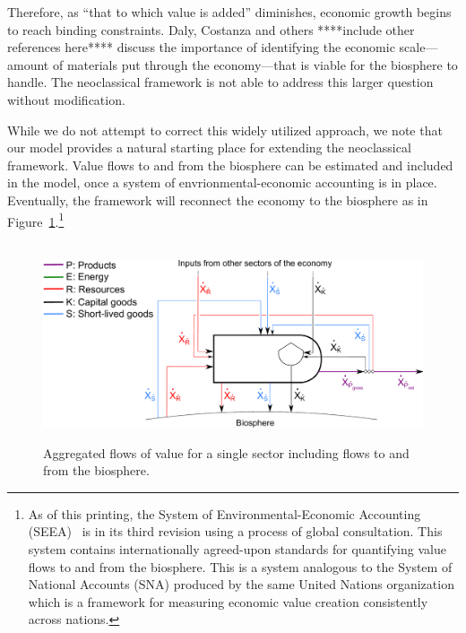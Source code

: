 Therefore, as ``that to which value is added'' diminishes, 
economic growth begins to reach binding constraints.
Daly, Costanza and others ****include other references here**** discuss the importance of 
identifying the economic scale---amount of materials put through the economy---that 
is viable for the biosphere to handle. 
The neoclassical framework is not able to address this larger question without modification.

While we do not attempt to correct this widely utilized approach, 
we note that our model provides a natural starting place for extending the neoclassical framework. 
Value flows to and from the biosphere can be estimated and included in the model, 
once a system of envrionmental-economic accounting is in place. 
Eventually, the framework will reconnect the economy to the biosphere 
as in Figure~\ref{fig:basic_value_with_biosphere_flows}.\footnote{As of this printing, 
the System of Environmental-Economic Accounting (SEEA)~\cite{UNSEEA:aa}
is in its third revision 
using a process of global consultation. 
This system contains internationally agreed-upon standards for quantifying value flows 
to and from the biosphere. 
This is a system analogous to the System of National Accounts (SNA) 
produced by the same United Nations organization
which is a framework for measuring economic value creation consistently across nations.}


\begin{figure}[h!]
\centering\
\includegraphics[width=0.8\linewidth]{Part_3/Chapter_Unfinished/images/PERKS_basic_unit_value_with_biosphere_flows.pdf}
\caption[Aggregated flows of value for a single sector including flows to and from the biosphere]{Aggregated flows of value for a single sector including flows to and from the biosphere.}
\label{fig:basic_value_with_biosphere_flows}
\end{figure}


